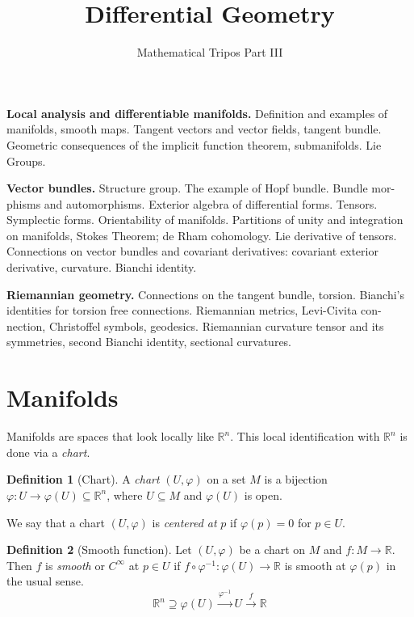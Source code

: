 \documentclass[a4paper,11pt]{article}
\title{Differential Geometry}
\author{Mathematical Tripos Part III}
\affiliation{University of Cambridge}
\theoremstyle{definition}
\newtheorem*{defn}{Definition}
\numberwithin{equation}{section}
\begin{document}
\maketitle
\flushbottom
\clearpage

\hrulefill

\textbf{Local analysis and differentiable manifolds.}
Definition and examples of manifolds, smooth maps. Tangent vectors and vector fields, tangent bundle. Geometric consequences of the implicit function theorem, submanifolds. Lie Groups.

\textbf{Vector bundles.}
Structure group. The example of Hopf bundle. Bundle mor- phisms and automorphisms. Exterior algebra of differential forms. Tensors. Symplectic forms. Orientability of manifolds. Partitions of unity and integration on manifolds, Stokes Theorem; de Rham cohomology. Lie derivative of tensors. Connections on vector bundles and covariant derivatives: covariant exterior derivative, curvature. Bianchi identity.


\textbf{Riemannian geometry.}
Connections on the tangent bundle, torsion. Bianchi’s identities for torsion free connections. Riemannian metrics, Levi-Civita con- nection, Christoffel symbols, geodesics. Riemannian curvature tensor and its symmetries, second Bianchi identity, sectional curvatures.

\hrulefill
\clearpage

\section{Manifolds}
Manifolds are spaces that look locally like $\mathbb{R}^n$. This local identification with $\mathbb{R}^n$ is done via a \emph{chart}.

\begin{defn}[Chart]
A \emph{chart} $(U,\varphi)$ on a set $M$ is a bijection $\varphi:U\rightarrow\varphi(U)\subseteq\mathbb{R}^n$, where $U\subseteq M$ and $\varphi(U)$ is open.

We say that a chart $(U,\varphi)$ is \emph{centered at} $p$ if $\varphi(p)=0$ for $p\in U$.
\end{defn}

\begin{defn}[Smooth function]
Let $(U,\varphi)$ be a chart on $M$ and $f:M\rightarrow\mathbb{R}$. Then $f$ is \emph{smooth} or $C^\infty$ at $p\in U$ if $f\circ\varphi^{-1}:\varphi(U)\rightarrow\mathbb{R}$ is smooth at $\varphi(p)$ in the usual sense.
\[
\mathbb{R}^n\supseteq\varphi(U)\xrightarrow{\varphi^{-1}}U\xrightarrow{f}\mathbb{R}
\]
\end{defn}
\end{document}
